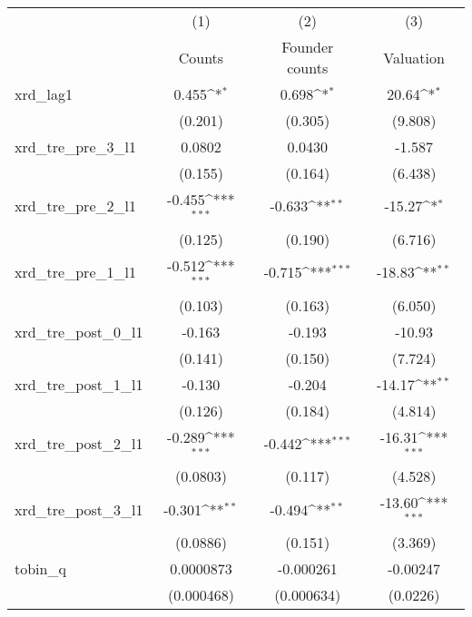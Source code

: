 {
\def\sym#1{\ifmmode^{#1}\else\(^{#1}\)\fi}
\begin{tabular}{l*{3}{c}}
\hline\hline
            &\multicolumn{1}{c}{(1)}&\multicolumn{1}{c}{(2)}&\multicolumn{1}{c}{(3)}\\
            &\multicolumn{1}{c}{Counts}&\multicolumn{1}{c}{Founder counts}&\multicolumn{1}{c}{Valuation}\\
\hline
xrd\_lag1    &       0.455\sym{*}  &       0.698\sym{*}  &       20.64\sym{*}  \\
            &     (0.201)         &     (0.305)         &     (9.808)         \\
[1em]
xrd\_tre\_pre\_3\_l1&      0.0802         &      0.0430         &      -1.587         \\
            &     (0.155)         &     (0.164)         &     (6.438)         \\
[1em]
xrd\_tre\_pre\_2\_l1&      -0.455\sym{***}&      -0.633\sym{**} &      -15.27\sym{*}  \\
            &     (0.125)         &     (0.190)         &     (6.716)         \\
[1em]
xrd\_tre\_pre\_1\_l1&      -0.512\sym{***}&      -0.715\sym{***}&      -18.83\sym{**} \\
            &     (0.103)         &     (0.163)         &     (6.050)         \\
[1em]
xrd\_tre\_post\_0\_l1&      -0.163         &      -0.193         &      -10.93         \\
            &     (0.141)         &     (0.150)         &     (7.724)         \\
[1em]
xrd\_tre\_post\_1\_l1&      -0.130         &      -0.204         &      -14.17\sym{**} \\
            &     (0.126)         &     (0.184)         &     (4.814)         \\
[1em]
xrd\_tre\_post\_2\_l1&      -0.289\sym{***}&      -0.442\sym{***}&      -16.31\sym{***}\\
            &    (0.0803)         &     (0.117)         &     (4.528)         \\
[1em]
xrd\_tre\_post\_3\_l1&      -0.301\sym{**} &      -0.494\sym{**} &      -13.60\sym{***}\\
            &    (0.0886)         &     (0.151)         &     (3.369)         \\
[1em]
tobin\_q     &   0.0000873         &   -0.000261         &    -0.00247         \\
            &  (0.000468)         &  (0.000634)         &    (0.0226)         \\

\end{tabular}}
